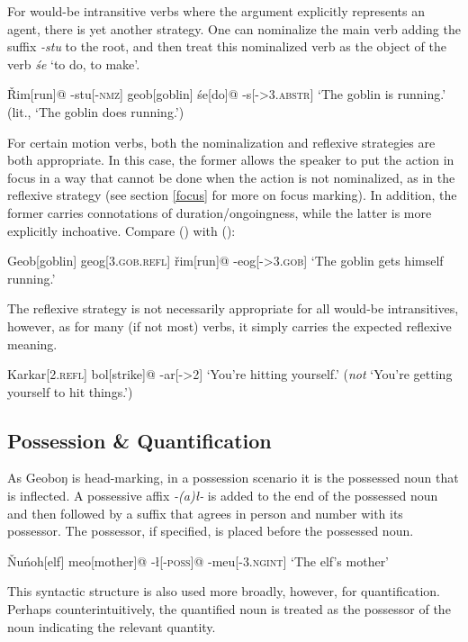 \documentclass[10pt]{article}
\newcommand{\sk}{\textsc}
\newcommand{\vr}{ř}
\newcommand{\vR}{Ř}
\newcommand{\vN}{Ň}
\newcommand{\engma}{ŋ}
\begin{document}
For would-be intransitive verbs where the argument explicitly represents an agent, there is yet another strategy. One can nominalize the main verb adding the suffix \textit{-stu} to the root, and then treat this nominalized verb as the object of the verb \textit{\'se} `to do, to make'.

\ex
\begingl
\vR im[run]@
-stu[-\sk{nmz}]
geob[goblin]
\'se[do]@
-s[-\sk{>3.abstr}]
\glft  `The goblin is running.' (lit., `The goblin does running.')
\endgl
\xe

For certain motion verbs, both the nominalization and reflexive strategies are both appropriate. In this case, the former allows the speaker to put the action in focus in a way that cannot be done when the action is not nominalized, as in the reflexive strategy (see section \ref{focus} for more on focus marking). In addition, the former carries connotations of duration/ongoingness, while the latter is more explicitly inchoative. Compare (\lastx) with (\nextx):

\ex
\begingl
Geob[goblin]
geog[\sk{3.gob.refl}]
\vr im[run]@
-eog[-\sk{>3.gob}]
\glft `The goblin gets himself running.'
\endgl
\xe

The reflexive strategy is not necessarily appropriate for all would-be intransitives, however, as for many (if not most) verbs, it simply carries the expected reflexive meaning.

\ex
\begingl
Karkar[\sk{2.refl}]
bol[strike]@
-ar[-\sk{>2}]
\glft  `You're hitting yourself.' (\emph{not} `You're getting yourself to hit things.')
\endgl
\xe

\subsection{Possession \& Quantification}

As Geobo{\engma} is head-marking, in a possession scenario it is the possessed noun that is inflected. A possessive affix \textit{-(a)\l-} is added to the end of the possessed noun and then followed by a suffix that agrees in person and number with its possessor. The possessor, if specified, is placed before the possessed noun.

\ex
\begingl
\vN u\'noh[elf]
meo[mother]@
-\l[-\sk{poss}]@
-meu[-\sk{3.ngint}]
\glft  `The elf's mother'
\endgl
\xe

This syntactic structure is also used more broadly, however, for quantification. Perhaps counterintuitively, the quantified noun is treated as the possessor of the noun indicating the relevant quantity.
\end{document}
